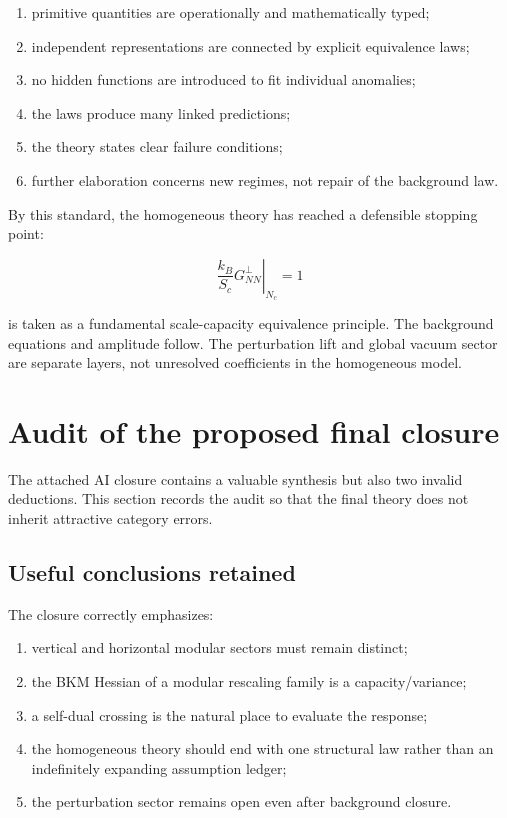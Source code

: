 \documentclass[
  11pt,
  letterpaper,
]{article}
\providecommand{\tightlist}{%
  \setlength{\itemsep}{0pt}\setlength{\parskip}{0pt}}
\begin{document}
\begin{enumerate}
\def\labelenumi{\arabic{enumi}.}
\tightlist
\item
  primitive quantities are operationally and mathematically typed;
\item
  independent representations are connected by explicit equivalence
  laws;
\item
  no hidden functions are introduced to fit individual anomalies;
\item
  the laws produce many linked predictions;
\item
  the theory states clear failure conditions;
\item
  further elaboration concerns new regimes, not repair of the background
  law.
\end{enumerate}

By this standard, the homogeneous theory has reached a defensible
stopping point:

\[
\boxed{
\left.\frac{k_B}{S_c}G^{\perp}_{NN}\right|_{N_c}=1
}
\]

is taken as a fundamental scale-capacity equivalence principle. The
background equations and amplitude follow. The perturbation lift and
global vacuum sector are separate layers, not unresolved coefficients in
the homogeneous model.

\section{Audit of the proposed final
closure}\label{audit-of-the-proposed-final-closure}

The attached AI closure contains a valuable synthesis but also two
invalid deductions. This section records the audit so that the final
theory does not inherit attractive category errors.

\subsection{Useful conclusions
retained}\label{useful-conclusions-retained}

The closure correctly emphasizes:

\begin{enumerate}
\def\labelenumi{\arabic{enumi}.}
\tightlist
\item
  vertical and horizontal modular sectors must remain distinct;
\item
  the BKM Hessian of a modular rescaling family is a capacity/variance;
\item
  a self-dual crossing is the natural place to evaluate the response;
\item
  the homogeneous theory should end with one structural law rather than
  an indefinitely expanding assumption ledger;
\item
  the perturbation sector remains open even after background closure.
\end{enumerate}
\end{document}
